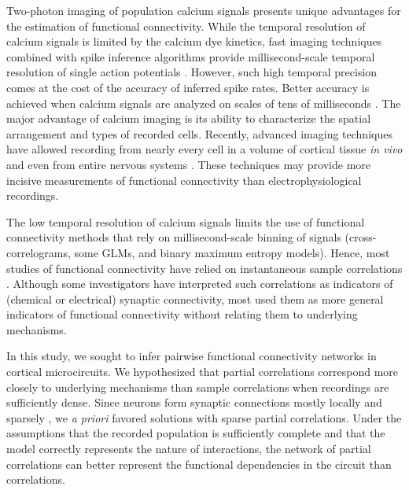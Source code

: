 Two-photon imaging of population calcium signals presents unique advantages for the estimation of functional connectivity.  While the temporal resolution of calcium signals is limited by the calcium dye kinetics, fast imaging techniques combined with spike inference algorithms provide millisecond-scale temporal resolution of single action potentials \cite{Grewe:2010}. However, such high temporal precision comes at the cost of the accuracy of inferred spike rates.  Better accuracy is achieved when calcium signals are analyzed on scales of tens of milliseconds \cite{Cotton:2013, Theis:2014}.  The major advantage of calcium imaging is its ability to characterize the spatial arrangement and types of recorded cells.  Recently, advanced imaging techniques have allowed recording from nearly every cell in a volume of cortical tissue  \emph{in vivo} \cite{Katona:2012, Cotton:2013} and even from entire nervous systems \cite{Leung:2013, Ahrens:2013}.  These techniques may provide more incisive measurements of functional connectivity than electrophysiological recordings.

The low temporal resolution of calcium signals limits the use of functional connectivity methods that rely on millisecond-scale binning of signals (cross-correlograms, some GLMs, and binary maximum entropy models).  Hence, most studies of functional connectivity have relied on instantaneous sample correlations \cite{Greenberg:2008, Golshani:2009, Hofer:2011, Malmersjo:2013} .  Although some investigators have interpreted such correlations as indicators of (chemical or electrical) synaptic connectivity, most used them as more general indicators of functional connectivity without relating them to underlying mechanisms.

In this study, we sought to infer pairwise functional connectivity networks  in cortical microcircuits. We hypothesized that partial correlations correspond more closely to underlying mechanisms than sample correlations when recordings are sufficiently dense.  Since neurons form synaptic connections mostly locally and sparsely \cite{Perin:2011}, we \emph{a priori} favored solutions with sparse partial correlations.  Under the assumptions that the recorded population is sufficiently complete and that the model correctly represents the nature of interactions, the network of partial correlations can better represent the  functional dependencies in the circuit than correlations.

